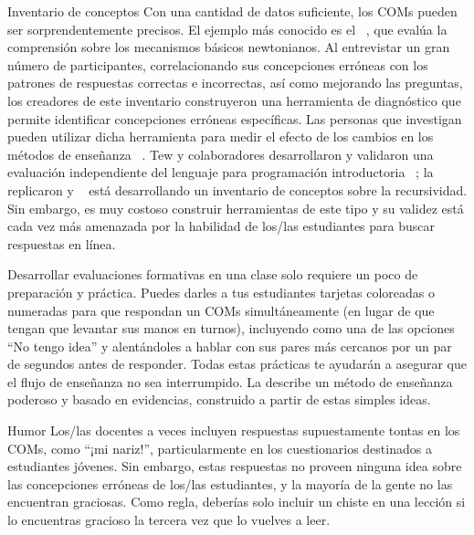 \begin{aside}{Inventario de conceptos}
Con una cantidad de datos suficiente,
los COMs pueden ser sorprendentemente precisos.
El ejemplo más conocido es el
  ~\cite{Hest1992},
que evalúa la comprensión sobre los mecanismos básicos newtonianos.
Al entrevistar un gran número de participantes,
correlacionando sus concepciones erróneas con los patrones de respuestas correctas e incorrectas,
así como mejorando las preguntas,
los creadores de este inventario construyeron una herramienta de diagnóstico que permite identificar concepciones erróneas específicas.
Las personas  que investigan pueden utilizar dicha herramienta para medir el efecto de los cambios en los métodos de enseñanza ~\cite{Hake1998}.
Tew y colaboradores desarrollaron y validaron una evaluación independiente del lenguaje para programación introductoria ~\cite{Tew2011};  \cite{Park2016} la replicaron y ~\cite{Hamo2017} está desarrollando un inventario de conceptos sobre la recursividad.
Sin embargo,
es muy costoso construir herramientas de este tipo
y su validez está cada vez más amenazada por la habilidad de los/las estudiantes para buscar respuestas en línea.
\end{aside}

Desarrollar evaluaciones formativas en una clase solo requiere un poco de preparación y práctica.
Puedes darles a tus estudiantes tarjetas coloreadas o numeradas para que respondan un COMs simultáneamente (en lugar de que tengan que levantar sus manos en turnos), incluyendo como una de las opciones ``No tengo idea''
y alentándoles a hablar con sus pares más cercanos por un par de segundos antes de responder. Todas estas prácticas te ayudarán a asegurar que el flujo de enseñanza no sea interrumpido.
La  describe un método de enseñanza poderoso y basado en evidencias, construido a partir de estas simples ideas. 

\begin{aside}{Humor}
Los/las docentes a veces incluyen respuestas supuestamente tontas en los COMs, como ``¡mi nariz!'', particularmente en los cuestionarios destinados a estudiantes jóvenes.
Sin embargo,
estas respuestas no proveen ninguna idea sobre las concepciones erróneas de los/las estudiantes, y la mayoría de la gente no las encuentran graciosas.
Como regla,
deberías solo incluir un chiste en una lección si lo encuentras gracioso la tercera vez que lo vuelves a leer.
\end{aside}

